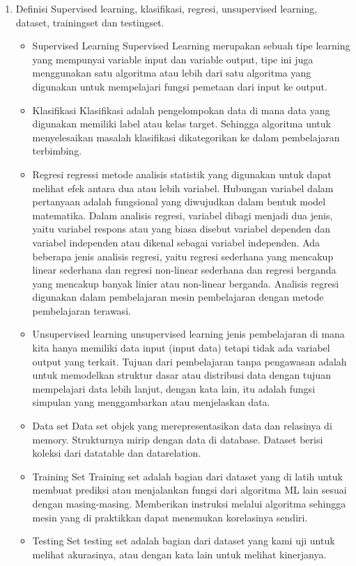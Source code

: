 \begin{enumerate}
	\item Definisi
	\hfill\break
	Supervised learning, klasifikasi, regresi, unsupervised learning, dataset, trainingset dan testingset.
	\begin{itemize}
		\item Supervised Learning
		\hfill\break
		Supervised Learning merupakan sebuah tipe learning yang mempunyai variable input dan variable output, tipe ini juga menggunakan satu algoritma atau lebih dari satu algoritma yang digunakan untuk mempelajari fungsi  pemetaan dari input ke output.
		\item Klasifikasi
		\hfill\break
		Klasifikasi adalah pengelompokan data di mana data yang digunakan memiliki label atau kelas target. Sehingga algoritma untuk menyelesaikan masalah klasifikasi dikategorikan ke dalam pembelajaran terbimbing.
		\item Regresi
		\hfill\break
		regressi metode analisis statistik yang digunakan untuk dapat melihat efek antara dua atau lebih variabel. Hubungan variabel dalam pertanyaan adalah fungsional yang diwujudkan dalam bentuk model matematika. Dalam analisis regresi, variabel dibagi menjadi dua jenis, yaitu variabel respons atau yang biasa disebut variabel dependen dan variabel independen atau dikenal sebagai variabel independen. Ada beberapa jenis analisis regresi, yaitu regresi sederhana yang mencakup linear sederhana dan regresi non-linear sederhana dan regresi berganda yang mencakup banyak linier atau non-linear berganda. Analisis regresi digunakan dalam pembelajaran mesin pembelajaran dengan metode pembelajaran terawasi.
		\item Unsupervised learning 
		\hfill\break
		unsupervised learning jenis pembelajaran di mana kita hanya memiliki data input (input data) tetapi tidak ada variabel output yang terkait. Tujuan dari pembelajaran tanpa pengawasan adalah untuk memodelkan struktur dasar atau distribusi data dengan tujuan mempelajari data lebih lanjut, dengan kata lain, itu adalah fungsi simpulan yang menggambarkan atau menjelaskan data.
		\item Data set
		\hfill\break
		Data set objek yang merepresentasikan data dan relasinya di memory. Strukturnya mirip dengan data di database. Dataset berisi koleksi dari datatable dan datarelation.
		\item Training Set
		\hfill\break
		Training set adalah bagian dari dataset yang di latih untuk membuat prediksi atau menjalankan fungsi dari algoritma ML lain sesuai dengan masing-masing. Memberikan instruksi melalui algoritma sehingga mesin yang di praktikkan dapat menemukan korelasinya sendiri.
		\item Testing Set
		\hfill\break
		testing set adalah bagian dari dataset yang kami uji untuk melihat akurasinya, atau dengan kata lain untuk melihat kinerjanya.
	\end{itemize}
\end{enumerate}
